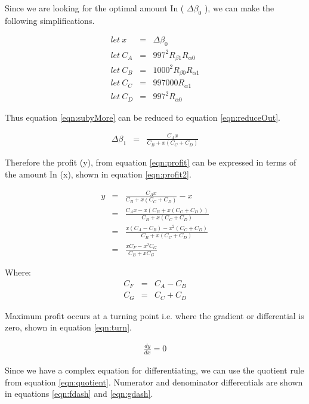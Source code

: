 \documentclass[runningheads]{llncs}
\begin{document}
Since we are looking for the optimal amount In ( \(\Delta\beta_{0}\) ), we can make the following simplifications.

\begin{eqnarray}
	let \: x &=& \Delta\beta_{0}\\
	let \: C_{A} &=& 997^2 R_{\beta 1}  R_{\alpha 0}\\
	let \: C_{B} &=& 1000^2 R_{\beta 0} R_{\alpha 1}\\
	let \: C_{C} &=& 997000  R_{\alpha 1}\\
	let \: C_{D} &=& 997^2  R_{\alpha 0}
\end{eqnarray}

Thus equation \ref{eqn:subyMore} can be reduced to equation \ref{eqn:reduceOut}.

\begin{eqnarray}
	\Delta\beta_{1}  &=& \frac{C_{A} x}{C_{B} + x(C_{C} + C_{D})} \label{eqn:reduceOut}
\end{eqnarray}

Therefore the profit (y), from equation \ref{eqn:profit} can be expressed in terms of the amount In (x), shown in equation \ref{eqn:profit2}.

\begin{eqnarray}
	y  &=& \frac{C_{A} x}{C_{B} + x(C_{C} + C_{D})} - x \label{eqn:profit2}\\
	&=& \frac{C_{A} x - x(C_{B} + x(C_{C} + C_{D}))}{C_{B} + x(C_{C} + C_{D})} \label{eqn:profit3}\\
	&=& \frac{x(C_{A} - C_{B}) - x^2(C_{C} + C_{D})}{C_{B} + x(C_{C} + C_{D})} \label{eqn:profit4}\\
	&=& \frac{x C_{F} - x^2 C_{G} }{C_{B} + x C_{G}} \label{eqn:profit5}
\end{eqnarray}

Where:
\begin{eqnarray}
	C_{F}  &=& C_{A} - C_{B}\\
	C_{G}  &=& C_{C} + C_{D}
\end{eqnarray}

Maximum profit occurs at a turning point i.e. where the gradient or differential is zero, shown in equation \ref{eqn:turn}.

\begin{eqnarray}
	\frac{dy}{dx} = 0 \label{eqn:turn}
\end{eqnarray}

Since we have a complex equation for differentiating, we can use the quotient rule from equation \ref{eqn:quotient}. Numerator and denominator differentials are shown in equations \ref{eqn:fdash} and \ref{eqn:gdash}.
\end{document}
